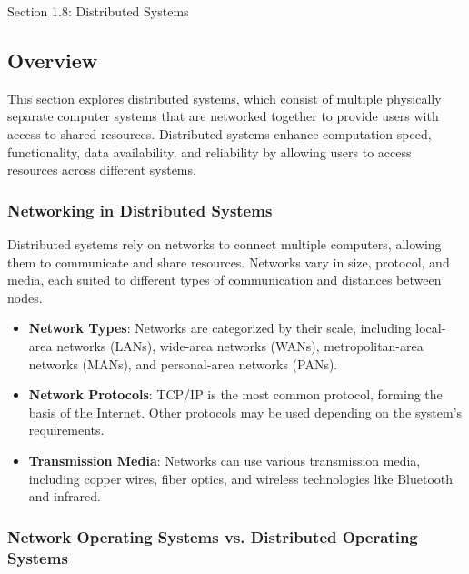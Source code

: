\begin{notes}{Section 1.8: Distributed Systems}
    \subsection*{Overview}

    This section explores distributed systems, which consist of multiple physically separate computer systems that are networked together to provide users with access to shared resources. Distributed 
    systems enhance computation speed, functionality, data availability, and reliability by allowing users to access resources across different systems.
    
    \subsubsection*{Networking in Distributed Systems}
    
    Distributed systems rely on networks to connect multiple computers, allowing them to communicate and share resources. Networks vary in size, protocol, and media, each suited to different types of 
    communication and distances between nodes.
    
    \begin{highlight}
    
    \begin{itemize}
        \item \textbf{Network Types}: Networks are categorized by their scale, including local-area networks (LANs), wide-area networks (WANs), metropolitan-area networks (MANs), and personal-area networks (PANs).
        \item \textbf{Network Protocols}: TCP/IP is the most common protocol, forming the basis of the Internet. Other protocols may be used depending on the system's requirements.
        \item \textbf{Transmission Media}: Networks can use various transmission media, including copper wires, fiber optics, and wireless technologies like Bluetooth and infrared.
    \end{itemize}
    
    \end{highlight}
    
    \subsubsection*{Network Operating Systems vs. Distributed Operating Systems}
    

\end{notes}
